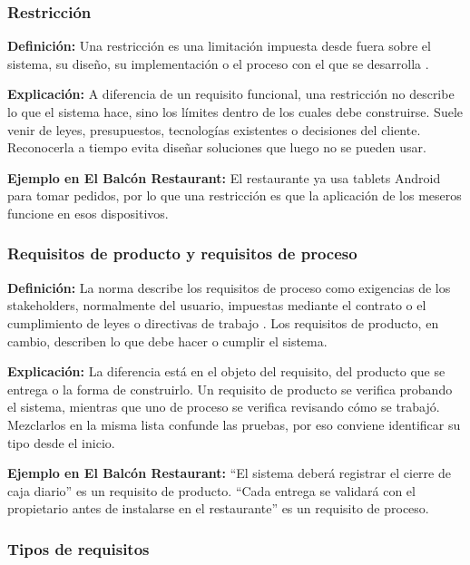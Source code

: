 \subsubsection{Restricción}

\textbf{Definición:} Una restricción es una limitación impuesta desde fuera sobre el sistema, su diseño, su implementación o el proceso con el que se desarrolla \cite[\nopp cl.~3.1.7]{ieee29148}.

\textbf{Explicación:} A diferencia de un requisito funcional, una restricción no describe lo que el sistema hace, sino los límites dentro de los cuales debe construirse. Suele venir de leyes, presupuestos, tecnologías existentes o decisiones del cliente. Reconocerla a tiempo evita diseñar soluciones que luego no se pueden usar.

\textbf{Ejemplo en El Balcón Restaurant:} El restaurante ya usa tablets Android para tomar pedidos, por lo que una restricción es que la aplicación de los meseros funcione en esos dispositivos.

\subsubsection{Requisitos de producto y requisitos de proceso}

\textbf{Definición:} La norma describe los requisitos de proceso como exigencias de los stakeholders, normalmente del usuario, impuestas mediante el contrato o el cumplimiento de leyes o directivas de trabajo \cite[\nopp cl.~5.2.8.3]{ieee29148}. Los requisitos de producto, en cambio, describen lo que debe hacer o cumplir el sistema.

\textbf{Explicación:} La diferencia está en el objeto del requisito, del producto que se entrega o la forma de construirlo. Un requisito de producto se verifica probando el sistema, mientras que uno de proceso se verifica revisando cómo se trabajó. Mezclarlos en la misma lista confunde las pruebas, por eso conviene identificar su tipo desde el inicio.

\textbf{Ejemplo en El Balcón Restaurant:} “El sistema deberá registrar el cierre de caja diario” es un requisito de producto. “Cada entrega se validará con el propietario antes de instalarse en el restaurante” es un requisito de proceso.

\subsubsection{Tipos de requisitos}

